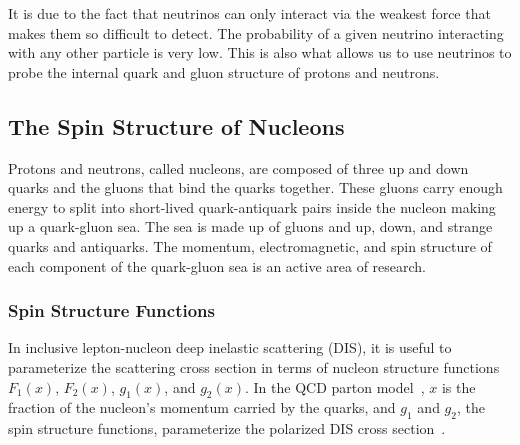 It is due to the fact that neutrinos can only interact via the weakest force
that makes them so difficult to detect. The probability of a given neutrino
interacting with any other particle is very low. This is also what allows us to
use neutrinos to probe the internal quark and gluon structure of protons and
neutrons.

\subsection{The Spin Structure of Nucleons} \label{sec:nuctheory}
  Protons and neutrons, called nucleons, are composed of three up and down
  quarks and the gluons that bind the quarks together. These gluons carry
  enough energy to split into short-lived quark-antiquark pairs inside the
  nucleon making up a quark-gluon sea. The sea is made up of gluons and up,
  down, and strange quarks and antiquarks. The momentum, electromagnetic, and
  spin structure of each component of the quark-gluon sea is an active area of
  research.

  \subsubsection{Spin Structure Functions}
  In inclusive lepton-nucleon deep inelastic scattering (DIS), it is useful to
  parameterize the scattering cross section in terms of nucleon structure
  functions $F_1(x)$, $F_2(x)$, $g_1(x)$, and $g_2(x)$. In the QCD parton
  model~\cite{Feynman:1969wa}, $x$ is the fraction of the nucleon's momentum
  carried by the quarks, and $g_1$ and $g_2$, the spin structure functions,
  parameterize the polarized DIS cross section~\cite{Thomas:2001kw}.

